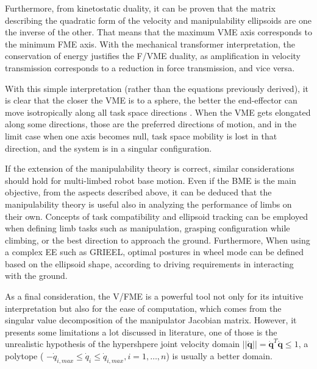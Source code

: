 Furthermore, from kinetostatic duality, it can be proven that the matrix describing the quadratic form of the velocity and manipulability ellipsoids are one the inverse of the other. That means that the maximum VME axis corresponds to the minimum FME axis. 
With the mechanical transformer interpretation, the conservation of energy justifies the F/VME duality, as amplification in velocity transmission corresponds to a reduction in force transmission, and vice versa\cite{TaskCompatibilityEllipsoid}.

With this simple interpretation (rather than the equations previously derived), it is clear that the closer the VME is to a sphere, the better the end-effector can move isotropically along all task space directions \cite{Siciliano}. When the VME gets elongated along some directions, those are the preferred directions of motion, 
and in the limit case when one axis becomes null, task space mobility is lost in that direction, and the system is in a singular configuration. 

If the extension of the manipulability theory is correct, similar considerations should hold for multi-limbed robot base motion. 
Even if the BME is the main objective, from the aspects described above, it can be deduced that the manipulability theory is useful also in analyzing the performance of limbs on their own. Concepts of task compatibility\cite{TaskCompatibilityPosture} and ellipsoid tracking \cite{EllipsoidTracking} can be employed when defining limb tasks such as manipulation, grasping configuration while climbing, or the best direction to approach the ground.
Furthermore, When using a complex EE such as GRIEEL, optimal postures in wheel mode can be defined based on the ellipsoid shape, according to driving requirements in interacting with the ground. 



As a final consideration, the V/FME is a powerful tool not only for its intuitive interpretation but also for the ease of computation, which comes from the singular value decomposition of the manipulator Jacobian matrix\cite{Siciliano}\cite{YoshikawaRoboticsBook}. 
However, it presents some limitations a lot discussed in literature\cite{PolytopesManipulability}\cite{LimitsEllipsoid}, one of those is the unrealistic hypothesis of the hypershpere joint velocity domain $||\dot{\mathbf{q}}|| = \dot{\mathbf{q}}^T\dot{\mathbf{q}}\leq 1$, a polytope ( $-\dot{q}_{i,max} \leq \dot{q}_i \leq \dot{q}_{i,max}, i=1,\dots,n$) is usually a better domain.

